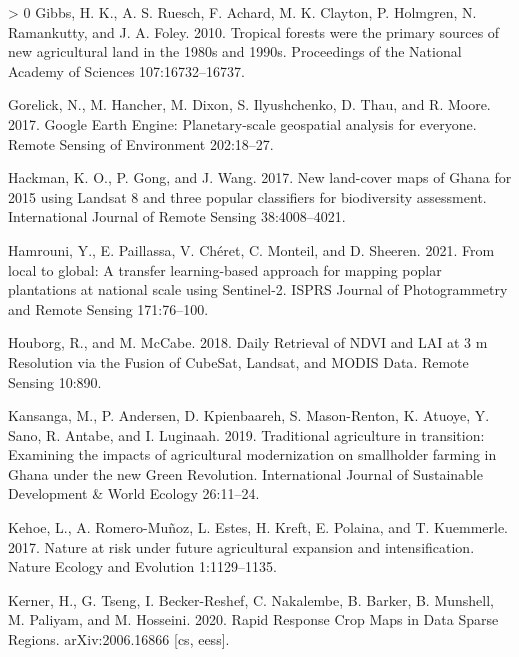 \documentclass[11pt,a4paper]{article}
\newlength{\cslhangindent}
\newenvironment{CSLReferences}[3] %
 {%
  \setlength{\parindent}{0pt}
  \ifodd #1 \everypar{\setlength{\hangindent}{\cslhangindent}}\ignorespaces\fi
  \ifnum #2 > 0
  \setlength{\parskip}{#2\baselineskip}
  \fi
 }%
 {}
\begin{document}
\begin{CSLReferences}{1}{0}
\leavevmode\hypertarget{ref-GibbsTropicalforestswere2010}{}%
Gibbs, H. K., A. S. Ruesch, F. Achard, M. K. Clayton, P. Holmgren, N.
Ramankutty, and J. A. Foley. 2010. Tropical forests were the primary
sources of new agricultural land in the 1980s and 1990s. Proceedings of
the National Academy of Sciences 107:16732--16737.

\leavevmode\hypertarget{ref-GorelickGoogleEarthEngine2017}{}%
Gorelick, N., M. Hancher, M. Dixon, S. Ilyushchenko, D. Thau, and R.
Moore. 2017. Google {Earth Engine}: {Planetary}-scale geospatial
analysis for everyone. Remote Sensing of Environment 202:18--27.

\leavevmode\hypertarget{ref-hackmanNewLandcoverMaps2017}{}%
Hackman, K. O., P. Gong, and J. Wang. 2017. New land-cover maps of
{Ghana} for 2015 using {Landsat} 8 and three popular classifiers for
biodiversity assessment. International Journal of Remote Sensing
38:4008--4021.

\leavevmode\hypertarget{ref-hamrouniLocalGlobalTransfer2021}{}%
Hamrouni, Y., E. Paillassa, V. Chéret, C. Monteil, and D. Sheeren. 2021.
From local to global: {A} transfer learning-based approach for mapping
poplar plantations at national scale using {Sentinel}-2. ISPRS Journal
of Photogrammetry and Remote Sensing 171:76--100.

\leavevmode\hypertarget{ref-HouborgDailyRetrievalNDVI2018}{}%
Houborg, R., and M. McCabe. 2018. Daily {Retrieval} of {NDVI} and {LAI}
at 3 m {Resolution} via the {Fusion} of {CubeSat}, {Landsat}, and {MODIS
Data}. Remote Sensing 10:890.

\leavevmode\hypertarget{ref-KansangaTraditionalagriculturetransition2019}{}%
Kansanga, M., P. Andersen, D. Kpienbaareh, S. Mason-Renton, K. Atuoye,
Y. Sano, R. Antabe, and I. Luginaah. 2019. Traditional agriculture in
transition: Examining the impacts of agricultural modernization on
smallholder farming in {Ghana} under the new {Green Revolution}.
International Journal of Sustainable Development \& World Ecology
26:11--24.

\leavevmode\hypertarget{ref-kehoeNatureRiskFuture2017}{}%
Kehoe, L., A. Romero-Muñoz, L. Estes, H. Kreft, E. Polaina, and T.
Kuemmerle. 2017. Nature at risk under future agricultural expansion and
intensification. Nature Ecology and Evolution 1:1129--1135.

\leavevmode\hypertarget{ref-kernerRapidResponseCrop2020}{}%
Kerner, H., G. Tseng, I. Becker-Reshef, C. Nakalembe, B. Barker, B.
Munshell, M. Paliyam, and M. Hosseini. 2020. Rapid {Response Crop Maps}
in {Data Sparse Regions}. arXiv:2006.16866 {[}cs, eess{]}.


\end{CSLReferences}
\end{document}
